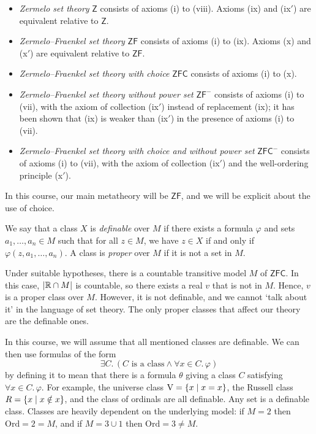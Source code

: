 \begin{itemize}
    \item \emph{Zermelo set theory} \( \mathsf{Z} \) consists of axioms (i) to (viii).
    Axioms (ix) and (ix\('\)) are equivalent relative to \( \mathsf{Z} \).
    \item \emph{Zermelo--Fraenkel set theory} \( \mathsf{ZF} \) consists of axioms (i) to (ix).
    Axioms (x) and (x\('\)) are equivalent relative to \( \mathsf{ZF} \).
    \item \emph{Zermelo--Fraenkel set theory with choice} \( \mathsf{ZFC} \) consists of axioms (i) to (x).
    \item \emph{Zermelo--Fraenkel set theory without power set} \( \mathsf{ZF}^- \) consists of axioms (i) to (vii), with the axiom of collection (ix\('\)) instead of replacement (ix); it has been shown that (ix) is weaker than (ix\('\)) in the presence of axioms (i) to (vii).
    \item \emph{Zermelo--Fraenkel set theory with choice and without power set} \( \mathsf{ZFC}^- \) consists of axioms (i) to (vii), with the axiom of collection (ix\('\)) and the well-ordering principle (x\('\)).
\end{itemize}
In this course, our main metatheory will be \( \mathsf{ZF} \), and we will be explicit about the use of choice.

We say that a class \( X \) is \emph{definable} over \( M \) if there exists a formula \( \varphi \) and sets \( a_1, \dots, a_n \in M \) such that for all \( z \in M \), we have \( z \in X \) if and only if \( \varphi(z, a_1, \dots, a_n) \).
A class is \emph{proper} over \( M \) if it is not a set in \( M \).

Under suitable hypotheses, there is a countable transitive model \( M \) of \( \mathsf{ZFC} \).
In this case, \( \abs{\mathbb R \cap M} \) is countable, so there exists a real \( v \) that is not in \( M \).
Hence, \( v \) is a proper class over \( M \).
However, it is not definable, and we cannot `talk about it' in the language of set theory.
The only proper classes that affect our theory are the definable ones.

In this course, we will assume that all mentioned classes are definable.
We can then use formulas of the form
\[ \exists C.\, (C \text{ is a class} \wedge \forall x \in C.\, \varphi) \]
by defining it to mean that there is a formula \( \theta \) giving a class \( C \) satisfying \( \forall x \in C.\, \varphi \).
For example, the universe class \( \mathrm{V} = \qty{x \mid x = x} \), the Russell class \( R = \qty{x \mid x \notin x} \), and the class of ordinals are all definable.
Any set is a definable class.
Classes are heavily dependent on the underlying model: if \( M = 2 \) then \( \mathrm{Ord} = 2 = M \), and if \( M = 3 \cup \qty{1} \) then \( \mathrm{Ord} = 3 \neq M \).

